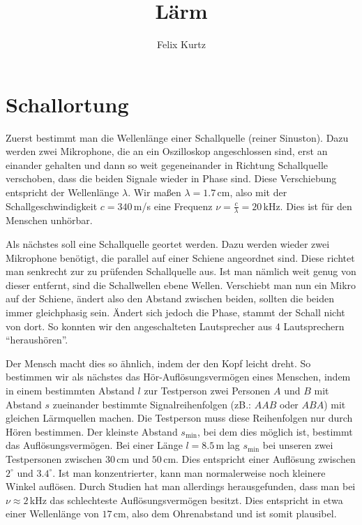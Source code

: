\documentclass[12pt,a4paper,headinclude,bibtotoc]{scrartcl}
\begin{document}
\title{Lärm}
\author{Felix Kurtz}
\maketitle

\section{Schallortung}
Zuerst bestimmt man die Wellenlänge einer Schallquelle (reiner Sinuston).
Dazu werden zwei Mikrophone, die an ein Oszilloskop angeschlossen sind, erst an einander gehalten und dann so weit gegeneinander in Richtung Schallquelle verschoben, dass die beiden Signale wieder in Phase sind.
Diese Verschiebung entspricht der Wellenlänge $\lambda$.
Wir maßen $\lambda=1.7\,$cm, also mit der Schallgeschwindigkeit $c=340\,$m/s eine Frequenz $\nu = \frac{c}{\lambda}=20\,$kHz.
Dies ist für den Menschen unhörbar.

Als nächstes soll eine Schallquelle geortet werden.
Dazu werden wieder zwei Mikrophone benötigt, die parallel auf einer Schiene angeordnet sind.
Diese richtet man senkrecht zur zu prüfenden Schallquelle aus.
Ist man nämlich weit genug von dieser entfernt, sind die Schallwellen ebene Wellen.
Verschiebt man nun ein Mikro auf der Schiene, ändert also den Abstand zwischen beiden, sollten die beiden immer gleichphasig sein.
Ändert sich jedoch die Phase, stammt der Schall nicht von dort.
So konnten wir den angeschalteten Lautsprecher aus 4 Lautsprechern "`heraushören"'.

Der Mensch macht dies so ähnlich, indem der den Kopf leicht dreht.
So bestimmen wir als nächstes das Hör-Auflösungsvermögen eines Menschen, indem in einem bestimmten  Abstand $l$ zur Testperson zwei Personen $A$ und $B$ mit  Abstand $s$ zueinander bestimmte Signalreihenfolgen (zB.: $AAB$ oder $ABA$) mit gleichen Lärmquellen machen.
Die Testperson muss diese Reihenfolgen nur durch Hören bestimmen.
Der kleinste Abstand $s_\text{min}$, bei dem dies möglich ist, bestimmt das Auflösungsvermögen.
Bei einer Länge $l=8.5\,$m lag $s_\text{min}$ bei unseren zwei Testpersonen zwischen $30\,$cm und $50\,$cm.
Dies entspricht einer Auflösung zwischen $2^\circ$ und $3.4^\circ$.
Ist man konzentrierter, kann man normalerweise noch kleinere Winkel auflösen.
Durch Studien hat man allerdings herausgefunden, dass man bei $\nu\approx 2\,$kHz das schlechteste Auflösungsvermögen besitzt.
Dies entspricht in etwa einer Wellenlänge von $17\,$cm, also dem Ohrenabstand und ist somit plausibel.
\end{document}
